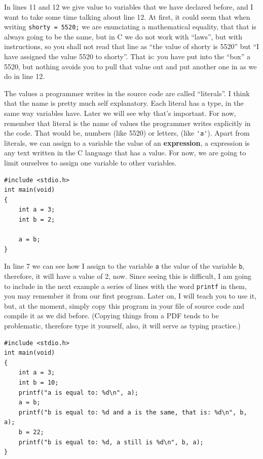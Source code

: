 \documentclass[a4paper]{article}
\begin{document}
In lines 11 and 12 we give value to variables that we have declared before,
and I want to take some time talking about line 12. At first, it could seem
that when writing \verb!shorty = 5520;! we are enunciating a mathematical
equality, that that is always going to be the same, but in C we do not work with
``laws'', but with instructions, so you shall not read that line as ``the value
of shorty is 5520'' but ``I have assigned the value 5520 to shorty''. That is:
you have put into the ``box'' a 5520, but nothing avoids you to pull that
value out and put another one in as we do in line 12.

The values a programmer writes in the source code are called ``literals''. I
think that the name is pretty much self explanatory. Each literal has a type,
in the same way variables have. Later we will see why that's important. For now,
remember that literal is the name of values the programmer writes
explicitly in the code. That would be, numbers (like 5520) or letters,
(like \verb!'a'!). Apart from literals, we can assign to a variable the
value of an \textbf{expression}, a expression is any text written in the C
language that has a value. For now, we are going to limit ourselves to assign
one variable to other variables.

\noindent
\begin{minipage}[H]{\linewidth}
\mbox{}
\begin{lstlisting}[style=C, caption={Assigning variables to other variables},
label={lst:variableAsignationBetween}]
#include <stdio.h>
int main(void)
{
    int a = 3;
    int b = 2;

    a = b;
}
\end{lstlisting}
\end{minipage}

In line 7 we can see how I assign to the variable \verb"a" the value of the
variable \verb!b!, therefore, it will have a value of 2, now. Since seeing this
is difficult, I am going to include in the next example a series of lines with
the word \verb!printf! in them, you may remember it from our first program.
Later on, I will teach you to use it, but, at the moment, simply copy this
program in your file of source code and compile it as we did before. (Copying
things from a PDF tends to be problematic, therefore type it yourself, also, it
will serve as typing practice.)

\noindent
\begin{minipage}[H]{\linewidth}
\mbox{}
\begin{lstlisting}[style=C, caption={Final example of variable using},
label={lst:variableFinalExample}]
#include <stdio.h>
int main(void)
{
    int a = 3;
    int b = 10;
    printf("a is equal to: %d\n", a);
    a = b;
    printf("b is equal to: %d and a is the same, that is: %d\n", b, a);
    b = 22;
    printf("b is equal to: %d, a still is %d\n", b, a);
}
\end{lstlisting}
\end{minipage}
\end{document}
